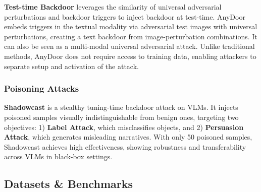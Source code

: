 \textbf{Test-time Backdoor} leverages the similarity of universal adversarial perturbations and backdoor triggers to inject backdoor at test-time. AnyDoor \cite{lu2024test} embeds triggers in the textual modality via adversarial test images with universal perturbations, creating a text backdoor from image-perturbation combinations. It can also be seen as a multi-modal universal adversarial attack. Unlike traditional methods, AnyDoor does not require access to training data, enabling attackers to separate setup and activation of the attack. 


\subsubsection{Poisoning Attacks}

\textbf{Shadowcast} \cite{xu2024shadowcast} is a stealthy tuning-time backdoor attack on VLMs. It injects poisoned samples visually indistinguishable from benign ones, targeting two objectives: 1) \textbf{Label Attack}, which misclassifies objects, and 2) \textbf{Persuasion Attack}, which generates misleading narratives. With only 50 poisoned samples, Shadowcast achieves high effectiveness, showing robustness and transferability across VLMs in black-box settings.




\subsection{Datasets \& Benchmarks}
\label{sec:vlm-dataset}

\begin{table}[htbp]
  \centering
  \caption{Safety and robustness benchmarks for VLMs.}
  \label{tab:vlm_safety_benchmarks}%
\end{table}

